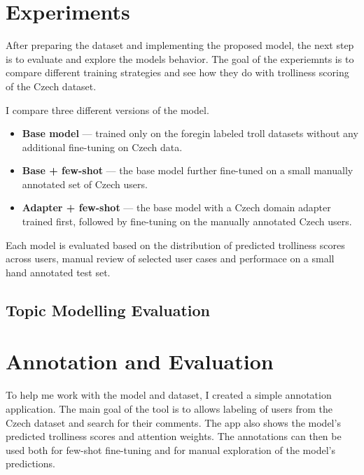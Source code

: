 \documentclass[twoside]{ctuthesis}
\theoremstyle{plain}
\theoremstyle{definition}
\theoremstyle{note}
\begin{document}
\chapter{Experiments}

After preparing the dataset and implementing the proposed model, the next step is to evaluate and explore the models behavior. The goal of the experiemnts is to compare different training strategies and see how they do with trolliness scoring of the Czech dataset.\par
I compare three different versions of the model. 
\begin{itemize} 
	\item \textbf{Base model} — trained only on the foregin labeled troll datasets without any additional fine-tuning on Czech data. 
	\item \textbf{Base + few-shot} — the base model further fine-tuned on a small manually annotated set of Czech users. 
	\item \textbf{Adapter + few-shot} — the base model with a Czech domain adapter trained first, followed by fine-tuning on the manually annotated Czech users. 
\end{itemize}
Each model is evaluated based on the distribution of predicted trolliness scores across users, manual review of selected user cases and performace on a small hand annotated test set.

\section{Topic Modelling Evaluation}

\section{}

\chapter{Annotation and Evaluation}

To help me work with the model and dataset, I created a simple annotation application. The main goal of the tool is to allows labeling of users from the Czech dataset and search for their comments. The app also shows the model's predicted trolliness scores and attention weights. The annotations can then be used both for few-shot fine-tuning and for manual exploration of the model's predictions.\par


\appendix

\printindex

 

\end{document}
